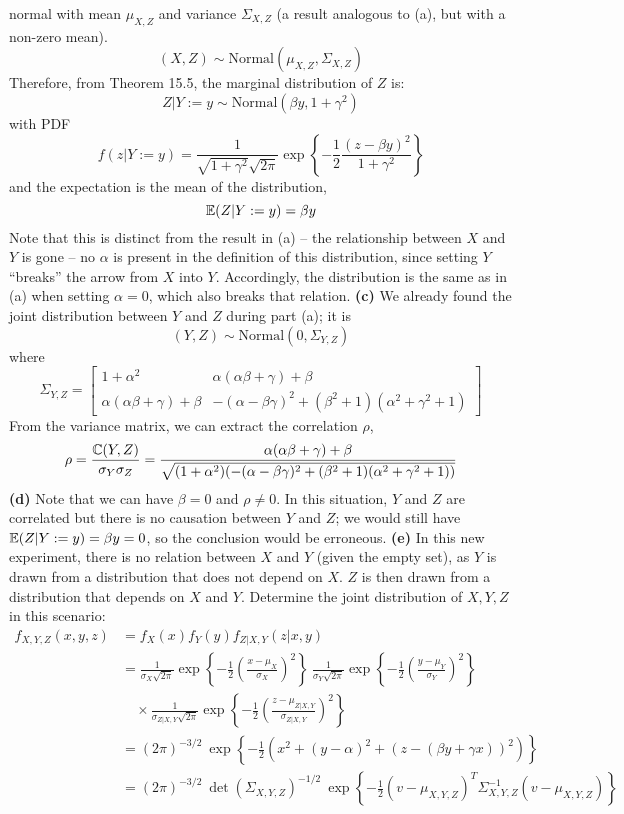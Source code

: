 normal with mean \(\mu_{X, Z}\) and variance \(\Sigma_{X, Z}\) (a result
analogous to (a), but with a non-zero mean).
\[
(X, Z) \sim \text{Normal}(\mu_{X, Z}, \Sigma_{X, Z})
\]
Therefore, from Theorem 15.5, the marginal distribution of \(Z\) is:
\[
Z | Y := y \sim \text{Normal}\left( \beta y, 1 + \gamma^{2}\right)
\]
with PDF
\[
f(z | Y := y) = \frac{1}{\sqrt{1 + \gamma^{2}} \sqrt{2 \pi}} \exp \left\{ -\frac{1}{2} \frac{\left( z - \beta y \right)^{2}}{1 + \gamma^{2}} \right\}
\]
and the expectation is the mean of the distribution,
\[
\operatorname{\mathbb{E}}(Z | Y := y) = \beta y
\]
Note that this is distinct from the result in (a) -- the relationship
between \(X\) and \(Y\) is gone -- no \(\alpha\) is present in the
definition of this distribution, since setting \(Y\) ``breaks'' the
arrow from \(X\) into \(Y\). Accordingly, the distribution is the same
as in (a) when setting \(\alpha = 0\), which also breaks that relation.
\textbf{(c)}
We already found the joint distribution between \(Y\) and \(Z\) during
part (a); it is
\[
(Y, Z) \sim \text{Normal}(0, \Sigma_{Y, Z})
\]
where
\[
\Sigma_{Y, Z} = \begin{bmatrix}
1 + \alpha^{2} & \alpha(\alpha \beta + \gamma) + \beta \\
\alpha(\alpha \beta + \gamma) + \beta & -(\alpha - \beta\gamma)^{2} + (\beta^{2} + 1)(\alpha^{2} + \gamma^{2} + 1)
\end{bmatrix}
\]
From the variance matrix, we can extract the correlation \(\rho\),
\[
\rho = \frac{\operatorname{\mathbb{C}}(Y, Z)}{\sigma_Y \sigma_Z} = \frac{\alpha(\alpha \beta + \gamma) + \beta}{\sqrt{(1 + \alpha^{2})(-(\alpha - \beta\gamma)^{2} + (\beta^{2} + 1)(\alpha^{2} + \gamma^{2} + 1))}}
\]
\textbf{(d)}
Note that we can have \(\beta = 0\) and \(\rho \neq 0\). In this
situation, \(Y\) and \(Z\) are correlated but there is no causation
between \(Y\) and \(Z\); we would still have
\(\operatorname{\mathbb{E}}(Z | Y := y) = \beta y = 0\), so the conclusion would be
erroneous.
\textbf{(e)}
In this new experiment, there is no relation between \(X\) and \(Y\)
(given the empty set), as \(Y\) is drawn from a distribution that does
not depend on \(X\). \(Z\) is then drawn from a distribution that
depends on \(X\) and \(Y\).
Determine the joint distribution of \(X, Y, Z\) in this scenario:
\begin{align*}
f_{X, Y, Z}(x, y, z) 
&= f_X(x) f_Y(y) f_{Z | X, Y}(z | x, y) 
\\
&= \frac{1}{\sigma_X \sqrt{2\pi}} \exp \left\{-\frac{1}{2} \left(\frac{x - \mu_X}{\sigma_X}\right)^{2} \right\}
\
\frac{1}{\sigma_Y \sqrt{2\pi}} \exp \left\{-\frac{1}{2} \left(\frac{y - \mu_Y}{\sigma_Y}\right)^{2} \right\}
\\
& \quad
\times \frac{1}{\sigma_{Z | X, Y} \sqrt{2\pi}} \exp \left\{-\frac{1}{2} \left(\frac{z - \mu_{Z | X, Y}}{\sigma_{Z | X, Y}}\right)^{2} \right\}
\\
&= (2 \pi)^{-3/2} \ \exp \left\{ -\frac{1}{2} \left(x^{2} + (y - \alpha)^{2} + (z - (\beta y + \gamma x))^{2} \right)\right\} 
\\
&= (2 \pi)^{-3/2} \ \det (\Sigma_{X, Y, Z})^{-1/2} \ \exp \left\{ -\frac{1}{2} (v - \mu_{X, Y, Z})^T \Sigma_{X, Y, Z}^{-1} (v - \mu_{X, Y, Z})\right\}
\end{align*}
